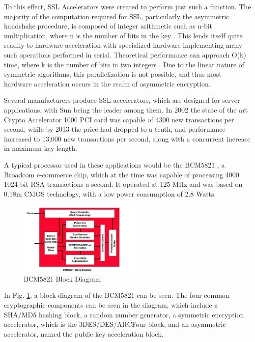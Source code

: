 \documentclass[journal]{IEEEtran}
\begin{document}
To this effect, SSL Accelerators were created to perform just such a function.  The majority of the computation required for SSL, particularly the asymmetric handshake procedure, is composed of integer arithmetic such as n-bit multiplication, where n is the number of bits in the key \cite{sslGPU}.  This lends itself quite readily to hardware acceleration with specialized hardware implementing many such operations performed in serial.  Theoretical performance can approach O(k) time, where k is the number of bits in two integers \cite{sslGPU}.  Due to the linear nature of symmetric algorithms, this parallelization is not possible, and thus most hardware acceleration occurs in the realm of asymmetric encryption.

Several manufacturers produce SSL accelerators, which are designed for server applications, with Sun being the leader among them.  In 2002 the state of the art Crypto Accelerator 1000 PCI card was capable of 4300 new transactions per second, while by 2013 the price had dropped to a tenth, and performance increased to 13,000 new transactions per second, along with a concurrent increase in maximum key length.

A typical processor used in these applications would be the BCM5821 \cite{broadcom}, a Broadcom e-commerce chip, which at the time was capable of processing 4000 1024-bit RSA transactions a second.  It operated at 125-MHz and was based on 0.18m CMOS technology, with a low power consumption of 2.8 Watts.

\begin{figure}[htbp]
	\centering
	\includegraphics[width=6cm,keepaspectratio]{img/broadcom.png}
	\caption{BCM5821 Block Diagram \cite{broadcom} }
	\label{broadcomFigure}
\end{figure}

In Fig. \ref{broadcomFigure}, a block diagram of the BCM5821 can be seen.  The four common cryptographic components can be seen in the diagram, which include a SHA/MD5 hashing block, a random number generator, a symmetric encryption accelerator, which is the 3DES/DES/ARCFour block, and an asymmetric accelerator, named the public key acceleration block.
\end{document}
